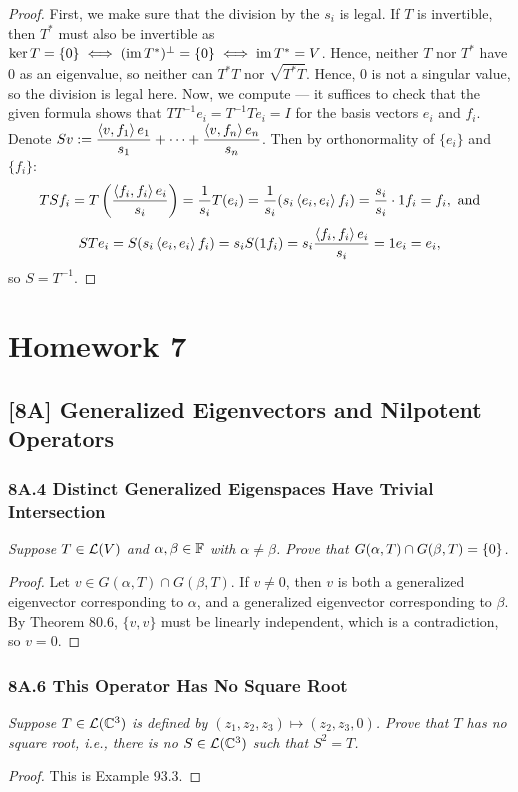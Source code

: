 \documentclass{article}
\begin{document}
\begin{proof}
First, we make sure that the division by the $s_i$ is legal. If $T$ is invertible, then $T^*$ must also be invertible as $\ker T = \{0\} \iff (\operatorname{im} T^*)^\perp = \{0\} \iff \operatorname{im} T^* = V$. Hence, neither $T$ nor $T^*$ have $0$ as an eigenvalue, so neither can $T^*T$ nor $\sqrt{T^*T}$. Hence, $0$ is not a singular value, so the division is legal here. Now, we compute --- it suffices to check that the given formula shows that $TT^{-1}e_i = T^{-1}Te_i = I$ for the basis vectors $e_i$ and $f_i$. Denote $Sv:=\displaystyle\frac{\left\langle v, f_1\right\rangle e_1}{s_1} + \cdots + \frac{\left\langle v, f_n\right\rangle e_n}{s_n}$. Then by orthonormality of $\{e_i\}$ and $\{f_i\}$:
$$TSf_i = T\left(\frac{\left\langle f_i, f_i\right\rangle e_i}{s_i} \right) = \frac 1{s_i}T(e_i) = \frac 1{s_i}(s_i\left\langle e_i, e_i\right\rangle f_i) = \frac{s_i}{s_i}\cdot 1f_i = f_i, \textrm{ and}$$
$$STe_i = S(s_i\left\langle e_i, e_i\right\rangle f_i) = s_iS(1f_i) = s_i \frac{\left\langle f_i, f_i\right\rangle e_i}{s_i} = 1e_i = e_i,$$
so $S = T^{-1}$.
\end{proof}
\section*{Homework 7}
\subsection*{[8A] Generalized Eigenvectors and Nilpotent Operators}
\subsubsection*{8A.4 Distinct Generalized Eigenspaces Have Trivial Intersection}
\textit{Suppose $T\in\mathcal L(V)$ and $\alpha,\beta\in\mathbb F$ with $\alpha\neq \beta$. Prove that $G(\alpha, T) \cap G(\beta, T) = \left\{0\right\}$.}
\begin{proof}
Let $v\in G(\alpha, T)\cap G(\beta, T)$. If $v\neq 0$, then $v$ is both a generalized eigenvector corresponding to $\alpha$, and a generalized eigenvector corresponding to $\beta$. By Theorem 80.6, $\{v, v\}$ must be linearly independent, which is a contradiction, so $v = 0$.
\end{proof}
\subsubsection*{8A.6 This Operator Has No Square Root}
\textit{Suppose $T\in\mathcal L(\mathbb C^3)$ is defined by $(z_1, z_2, z_3) \mapsto (z_2, z_3, 0)$. Prove that $T$ has no square root, i.e., there is no $S\in\mathcal L(\mathbb C^3)$ such that $S^2=T$.}
\begin{proof}
This is Example 93.3.
\end{proof}
\end{document}
